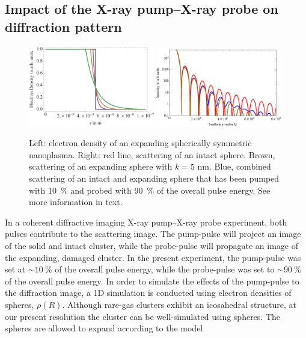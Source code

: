 \subsection{Impact of the X-ray pump--X-ray probe on diffraction pattern}\label{sec:pump--probe-considerations}
\begin{figure}
	\centering
		\includegraphics[width=0.49\textwidth]{images/electron-density-convoluted-object.png}
		\includegraphics[width=0.49\textwidth]{images/beam-convoluted-with-object.eps}
	\caption[Influence of X-ray pump--X-ray probe study in diffraction image.]{Left: electron density of an expanding spherically symmetric nanoplasma. Right: red line, scattering of an intact sphere. Brown, scattering of an expanding sphere with $k=5$ nm. Blue, combined scattering of an intact and expanding sphere that has been pumped with \SI{10}{\percent} and probed with \SI{90}{\percent} of the overall pulse energy. See more information in text.}
	\label{fig:electron-density-convoluted-object}
\end{figure}
In a coherent diffractive imaging X-ray pump--X-ray probe experiment, both pulses contribute to the scattering image. The pump-pulse will project an image of the solid and intact cluster, while the probe-pulse will propagate an image of the expanding, damaged cluster. In the present experiment, the pump-pulse was set at $\sim\SI{10}{\percent}$ of the overall pulse energy, while the probe-pulse was set to $\sim\SI{90}{\percent}$ of the overall pulse energy. In order to simulate the effects of the pump-pulse to the diffraction image, a 1D simulation is conducted using electron densities of spheres, $\rho\left(R\right)$. Although rare-gas clusters exhibit an icosahedral structure, at our present resolution the cluster can be well-simulated using spheres. The spheres are allowed to expand according to the model
